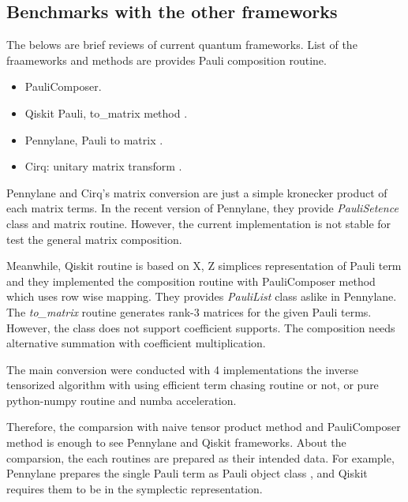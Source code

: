 \documentclass[twocolumn]{article}
\begin{document}
\subsection{Benchmarks with the other frameworks}

The belows are brief reviews of current quantum frameworks.
List of the fraameworks and methods are provides Pauli composition routine.

\begin{itemize}
    \item PauliComposer\cite{vidal_romero_paulicomposer_2023}.
    \item Qiskit Pauli, to\_matrix method \cite{Qiskit}.
    \item Pennylane, Pauli to matrix \cite{bergholm2018pennylane}. %
    \item Cirq: unitary matrix transform \cite{cirq_developers_2023_10247207}. %
\end{itemize}

Pennylane and Cirq's matrix conversion are just a simple kronecker product of each matrix terms.
In the recent version of Pennylane, they provide \textit{PauliSetence} class and matrix routine.
However, the current implementation is not stable for test the general matrix composition.%

Meanwhile, Qiskit routine is based on X, Z simplices representation of Pauli term 
and they implemented the composition routine with PauliComposer method 
which uses row wise mapping.
They provides \textit{PauliList} class aslike in Pennylane. 
The \textit{to\_matrix} routine generates rank-3 matrices for the given Pauli terms.
However, the class does not support coefficient supports. 
The composition needs alternative summation with coefficient multiplication.

The main conversion were conducted with 4 implementations the inverse tensorized algorithm
with using efficient term chasing routine or not, or pure python-numpy routine and numba acceleration.

Therefore, the comparsion with naive tensor product method and PauliComposer method
is enough to see Pennylane and Qiskit frameworks. 
About the comparsion, the each routines are prepared as their intended 
data. For example, Pennylane prepares the single Pauli term as Pauli object class
, and Qiskit requires them to be in the symplectic representation.
\end{document}
